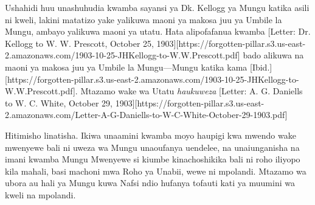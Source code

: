 Ushahidi huu unashuhudia kwamba sayansi ya Dk. Kellogg ya Mungu katika asili ni kweli, lakini matatizo yake yalikuwa maoni ya makosa juu ya Umbile la Mungu, ambayo yalikuwa maoni ya utatu. Hata alipofafanua kwamba [Letter: Dr. Kellogg to W. W. Prescott, October 25, 1903][https://forgotten-pillar.s3.us-east-2.amazonaws.com/1903-10-25-JHKellogg-to-W.W.Prescott.pdf] bado alikuwa na maoni ya makosa juu ya Umbile la Mungu—Mungu katika  kama [Ibid.][https://forgotten-pillar.s3.us-east-2.amazonaws.com/1903-10-25-JHKellogg-to-W.W.Prescott.pdf]. Mtazamo wake wa Utatu \textit{haukuweza} [Letter: A. G. Daniells to W. C. White, October 29, 1903][https://forgotten-pillar.s3.us-east-2.amazonaws.com/Letter-A-G-Daniells-to-W-C-White-October-29-1903.pdf]

Hitimisho linatisha. Ikiwa unaamini kwamba moyo haupigi kwa mwendo wake mwenyewe bali ni uweza wa Mungu unaoufanya uendelee, na unaiunganisha na imani kwamba Mungu Mwenyewe si kiumbe kinachoshikika bali ni roho iliyopo kila mahali, basi machoni mwa Roho ya Unabii, wewe ni mpolandi. Mtazamo wa ubora au hali ya Mungu kuwa Nafsi ndio hufanya tofauti kati ya muumini wa kweli na mpolandi.



